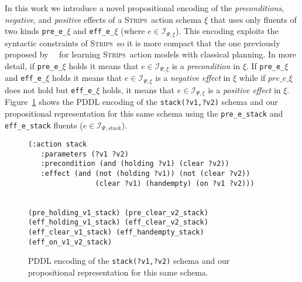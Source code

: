 \documentclass{article}
\newcommand{\strips}{\textsc{Strips}}
\begin{document}
In this work we introduce a novel propositional encoding of the {\em preconditions}, {\em negative}, and {\em positive} effects of a \strips\ action schema $\xi$ that uses only fluents of two kinds {\tt\small pre\_e\_$\xi$} and {\tt\small eff\_e\_$\xi$} (where $e\in{\mathcal I}_{\Psi,\xi}$). This encoding exploits the syntactic constraints of \strips\, so it is more compact that the one previously proposed by~\citeauthor{aineto2018learning}~\citeyear{aineto2018learning} for learning \strips\ action models with classical planning. In more detail, if {\tt\small pre\_e\_$\xi$} holds it means that $e\in{\mathcal I}_{\Psi,\xi}$ is a {\em precondition} in $\xi$. If {\tt\small pre\_e\_$\xi$} and {\tt\small eff\_e\_$\xi$} holds it means that $e\in{\mathcal I}_{\Psi,\xi}$ is a {\em negative effect} in $\xi$ while if $pre\_e\_\xi$ does not hold but {\tt\small eff\_e\_$\xi$} holds, it means that $e\in{\mathcal I}_{\Psi,\xi}$ is a {\em positive effect} in $\xi$. Figure~\ref{fig:propositional} shows the PDDL encoding of the {\tt\small stack(?v1,?v2)} schema and our propositional representation for this same schema using the {\tt\small pre\_e\_stack} and {\tt\small eff\_e\_stack} fluents ($e\in{\mathcal I}_{\Psi,stack}$).

\begin{figure}
  \begin{tiny}  
  \begin{verbatim}
(:action stack
   :parameters (?v1 ?v2)
   :precondition (and (holding ?v1) (clear ?v2))
   :effect (and (not (holding ?v1)) (not (clear ?v2))
                (clear ?v1) (handempty) (on ?v1 ?v2)))


(pre_holding_v1_stack) (pre_clear_v2_stack)
(eff_holding_v1_stack) (eff_clear_v2_stack)
(eff_clear_v1_stack) (eff_handempty_stack) (eff_on_v1_v2_stack)
  \end{verbatim}           
  \end{tiny}  
 \caption{\small PDDL encoding of the {\tt\small stack(?v1,?v2)} schema and our propositional representation for this same schema.}
\label{fig:propositional}
\end{figure}
\end{document}
